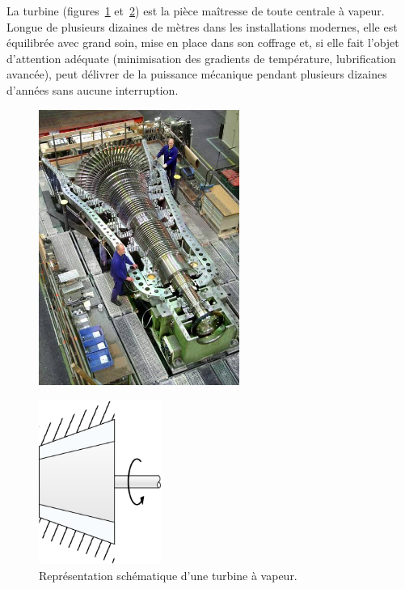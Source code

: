 		La turbine (figures~\ref{fig_centrale_turbine1} et~\ref{fig_centrale_turbine2}) est la pièce maîtresse de toute centrale à vapeur. Longue de plusieurs dizaines de mètres dans les installations modernes, elle est équilibrée avec grand soin, mise en place dans son coffrage et, si elle fait l’objet d’attention adéquate (minimisation des gradients de température, lubrification avancée), peut délivrer de la puissance mécanique pendant plusieurs dizaines d’années sans aucune interruption.

		\begin{figure}
			\begin{center}
				\includegraphics[height=9cm]{images/centrale_turbine_photo.jpg}
			\end{center}
			\label{fig_centrale_turbine1}
		\end{figure}

		\begin{figure}
			\begin{center}
				\includegraphics[width=4cm]{images/symbole_turbine.png}
			\end{center}
			\caption{Représentation schématique d’une turbine à vapeur.}
			\label{fig_centrale_turbine2}
		\end{figure}
		

